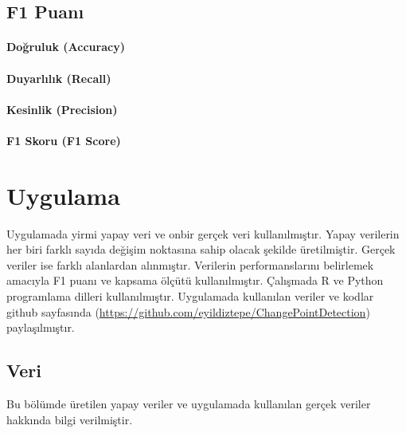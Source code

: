 \documentclass[12pt,twoside]{deuthesis}
\begin{document}
\hypertarget{f1-puanux131}{%
\section{F1 Puanı}\label{f1-puanux131}}

\hypertarget{doux11fruluk-accuracy}{%
\subsubsection{Doğruluk (Accuracy)}\label{doux11fruluk-accuracy}}

\hypertarget{duyarlux131lux131k-recall}{%
\subsubsection{Duyarlılık (Recall)}\label{duyarlux131lux131k-recall}}

\hypertarget{kesinlik-precision}{%
\subsubsection{Kesinlik (Precision)}\label{kesinlik-precision}}

\hypertarget{f1-skoru-f1-score}{%
\subsubsection{F1 Skoru (F1 Score)}\label{f1-skoru-f1-score}}

\hypertarget{Bolum3}{%
\chapter{Uygulama}\label{Bolum3}}

Uygulamada yirmi yapay veri ve onbir gerçek veri kullanılmıştır. Yapay verilerin her biri farklı sayıda değişim noktasına sahip olacak şekilde üretilmiştir. Gerçek veriler ise farklı alanlardan alınmıştır. Verilerin performanslarını belirlemek amacıyla F1 puanı ve kapsama ölçütü kullanılmıştır. Çalışmada R ve Python programlama dilleri kullanılmıştır. Uygulamada kullanılan veriler ve kodlar github sayfasında (\url{https://github.com/eyildiztepe/ChangePointDetection}) paylaşılmıştır.

\hypertarget{veri}{%
\section{Veri}\label{veri}}

Bu bölümde üretilen yapay veriler ve uygulamada kullanılan gerçek veriler hakkında bilgi verilmiştir.
\end{document}
